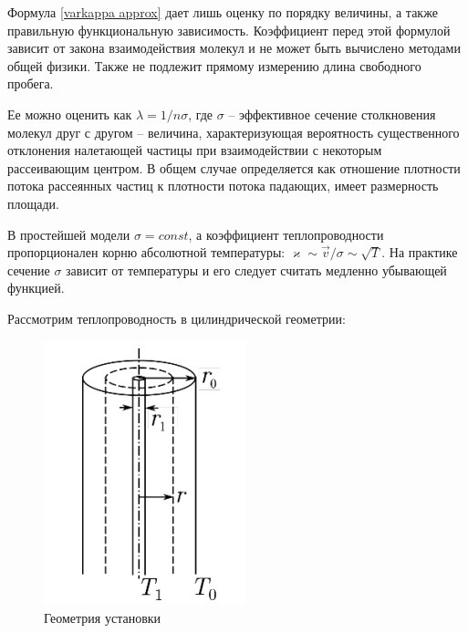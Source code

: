 \documentclass[a4paper,12pt]{report}
\begin{document}
    Формула \eqref{varkappa approx} дает лишь оценку по порядку величины, а также правильную функциональную зависимость. Коэффициент перед этой формулой зависит от закона взаимодействия молекул и не может быть вычислено методами общей физики. Также не подлежит прямому измерению длина свободного пробега.

    Ее можно оценить как $\lambda=1/n\sigma$, где $\sigma$ -- эффективное сечение столкновения молекул друг с другом -- величина, характеризующая вероятность существенного отклонения налетающей частицы при взаимодействии с некоторым рассеивающим центром. В общем случае определяется как отношение плотности потока рассеянных частиц к плотности потока падающих, имеет размерность площади.

    В простейшей модели $\sigma=const$, а коэффициент теплопроводности пропорционален корню абсолютной температуры: $\varkappa\sim\vec{v}/\sigma\sim\sqrt{T}$. На практике сечение $\sigma$ зависит от температуры и его следует считать медленно убывающей функцией.

    Рассмотрим теплопроводность в цилиндрической геометрии:
    \begin{figure}
        \vspace{-5mm}
        \centering
        \includegraphics[width=0.7\linewidth]{img/geometry}
        \caption{Геометрия установки}
    \end{figure}
\end{document}
